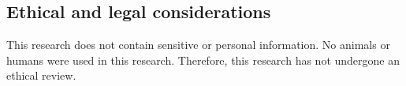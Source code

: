 \subsection{Ethical and legal considerations}
This research does not contain sensitive or personal information. No animals or humans were used in this research. Therefore, this research has not undergone an ethical review. 
